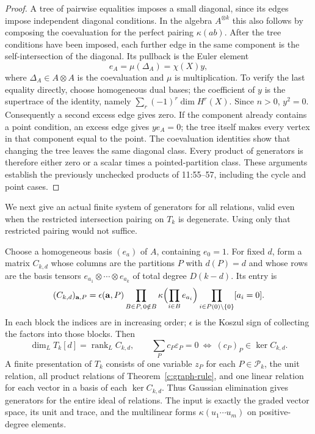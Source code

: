 \begin{proof}
A tree of pairwise equalities imposes a small diagonal, since its edges impose independent diagonal conditions. In the algebra $A^{\otimes k}$ this also follows by composing the coevaluation for the perfect pairing $\kappa(ab)$. After the tree conditions have been imposed, each further edge in the same component is the self-intersection of the diagonal. Its pullback is the Euler element
\[
 e_A=\mu(\Delta_A)=\chi(X)y,
\]
where $\Delta_A\in A\otimes A$ is the coevaluation and $\mu$ is multiplication. To verify the last equality directly, choose homogeneous dual bases; the coefficient of $y$ is the supertrace of the identity, namely $\sum_r(-1)^r\dim H^r(X)$. Since $n>0$, $y^2=0$. Consequently a second excess edge gives zero. If the component already contains a point condition, an excess edge gives $y e_A=0$; the tree itself makes every vertex in that component equal to the point. The coevaluation identities show that changing the tree leaves the same diagonal class. Every product of generators is therefore either zero or a scalar times a pointed-partition class. These arguments establish the previously unchecked products of 11:55--57, including the cycle and point cases.
\end{proof}

We next give an actual finite system of generators for all relations, valid even when the restricted intersection pairing on $T_k$ is degenerate. Using only that restricted pairing would not suffice.

\begin{theorem}
\label{c:matrix-presentation}
Choose a homogeneous basis $(e_a)$ of $A$, containing $e_0=1$. For fixed $d$, form a matrix $C_{k,d}$ whose columns are the partitions $P$ with $d(P)=d$ and whose rows are the basis tensors $e_{a_1}\otimes\cdots\otimes e_{a_k}$ of total degree $D(k-d)$. Its entry is
\begin{equation}
\label{c:contraction-matrix}
 (C_{k,d})_{\mathbf a,P}
 =\epsilon(\mathbf a,P)
 \prod_{B\in P,\,0\notin B}\kappa\Bigl(\prod_{i\in B}e_{a_i}\Bigr)
 \prod_{i\in P(0)\setminus\{0\}}[a_i=0].
\end{equation}
In each block the indices are in increasing order; $\epsilon$ is the Koszul sign of collecting the factors into those blocks. Then
\[
 \dim_L T_k[d]=\operatorname{rank}_L C_{k,d},\qquad
 \sum_Pc_P\varepsilon_P=0\ \Longleftrightarrow\ (c_P)_P\in\ker C_{k,d}.
\]
A finite presentation of $T_k$ consists of one variable $z_P$ for each $P\in\mathcal P_k$, the unit relation, all product relations of Theorem~\ref{c:graph-rule}, and one linear relation for each vector in a basis of each $\ker C_{k,d}$. Thus Gaussian elimination gives generators for the entire ideal of relations. The input is exactly the graded vector space, its unit and trace, and the multilinear forms $\kappa(u_1\cdots u_m)$ on positive-degree elements.
\end{theorem}

